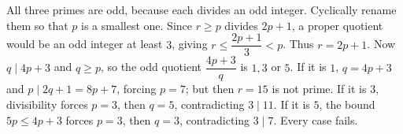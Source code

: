 All three primes are odd, because each divides an odd integer. Cyclically rename them so that $p$ is a smallest one. Since $r\ge p$ divides $2p+1$, a proper quotient would be an odd integer at least $3$, giving $r \le \dfrac{2p+1}{3} < p$. Thus $r=2p+1$. Now $q\mid4p+3$ and $q\ge p$, so the odd quotient $\dfrac{4p+3}{q}$ is $1,3$ or $5$. If it is $1$, $q=4p+3$ and $p\mid2q+1=8p+7$, forcing $p=7$; but then $r=15$ is not prime. If it is $3$, divisibility forces $p=3$, then $q=5$, contradicting $3\mid11$. If it is $5$, the bound $5p\le4p+3$ forces $p=3$, then $q=3$, contradicting $3\mid7$. Every case fails.
